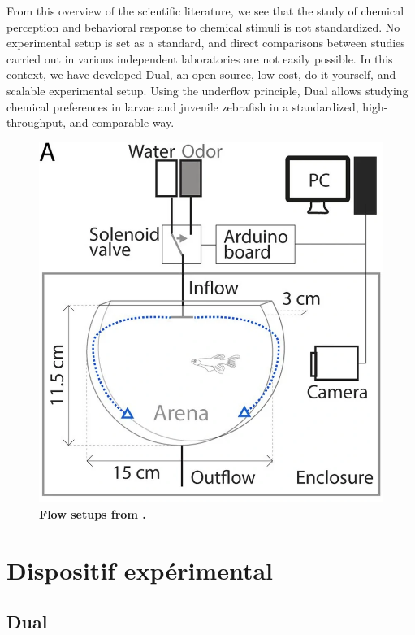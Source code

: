     From this overview of the scientific literature, we see that the study of chemical perception and behavioral response to chemical stimuli is not standardized. No experimental setup is set as a standard, and direct comparisons between studies carried out in various independent laboratories are not easily possible. In this context, we have developed Dual, an open-source, low cost, do it yourself, and scalable experimental setup. Using the underflow principle, Dual allows studying chemical preferences in larvae and juvenile zebrafish in a standardized, high-throughput, and comparable way.


    \begin{figure}[h]
      \centering
      \includegraphics[width=1\textwidth]{part_2/assets/flow_1.png}
      \caption{\textbf{Flow setups from \cite{kermen2020stimulus}.}}
      \label{flow_1_setup}
    \end{figure}

\chapter{Dispositif expérimental}

  \section{Dual}

